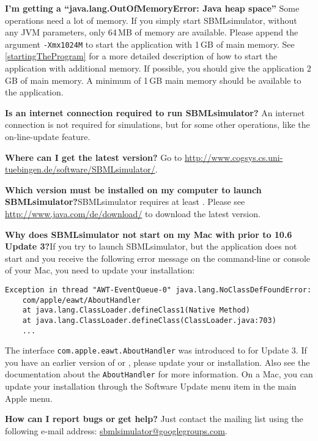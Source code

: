 \noindent \textbf{I'm getting a ``java.lang.OutOfMemoryError: Java heap space''}\newline
Some operations need a lot of memory. If you simply start SBMLsimulator, without any
JVM parameters, only 64\,MB of memory are available. Please append the argument
\texttt{-Xmx1024M} to start the application with 1\,GB of main memory. See
\vref{startingTheProgram} for a more detailed description of how to
start the application with additional memory. If possible, you should give the
application 2\,GB of main memory. A minimum of 1\,GB main memory should be
available to the application.\newline

\noindent \textbf{Is an internet connection required to run SBMLsimulator?}\newline
An internet connection is not required for simulations, but for some other operations,
like the on-line-update feature.\newline

\noindent \textbf{Where can I get the latest version?}\newline
Go to \url{http://www.cogsys.cs.uni-tuebingen.de/software/SBMLsimulator/}.\newline

\noindent \textbf{Which \Java version must be installed on my computer to launch
SBMLsimulator?}\newline SBMLsimulator requires at least . Please see
\url{http://www.java.com/de/download/} to download the latest \Java version.\newline

\noindent \textbf{Why does SBMLsimulator not start on my Mac with \MacOSX prior to
10.6 Update 3?}\newline If you try to launch SBMLsimulator, but the application does
not start and you receive the following error message on the command-line or
\Java console of your Mac, you need to update your \Java installation:
\begin{verbatim}
Exception in thread "AWT-EventQueue-0" java.lang.NoClassDefFoundError:
    com/apple/eawt/AboutHandler
    at java.lang.ClassLoader.defineClass1(Native Method)
    at java.lang.ClassLoader.defineClass(ClassLoader.java:703)
    ...
\end{verbatim}
The interface \texttt{com.apple.eawt.AboutHandler} was introduced to \Java for
 Update 3. If you have an earlier version of \MacOSX or \Java,
please update your \OS or \Java installation. Also see the \MacOSX documentation
about the \texttt{AboutHandler} for more information. On a Mac, you can update
your \Java installation through the Software Update menu item in the main Apple
menu.\newline

\noindent \textbf{How can I report bugs or get help?}\newline
Just contact the mailing list using the following e-mail address:  \href{mailto:sbmlsimulator@googlegroups.com}{\url{sbmlsimulator@googlegroups.com}}.


